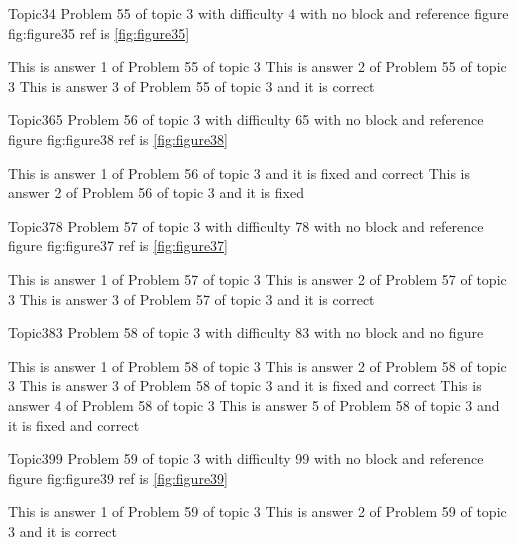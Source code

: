\documentclass[master]{exam}
\begin{document}
\begin{problem}{Topic3}{4}
	Problem 55 of topic 3 with difficulty 4 with no block and reference figure fig:figure35 ref is \ref{fig:figure35}
	\begin{answers}
		\answer This is answer 1 of Problem 55 of topic 3 
		\answer This is answer 2 of Problem 55 of topic 3 
		\answer[correct] This is answer 3 of Problem 55 of topic 3 and it is correct
	\end{answers}
\end{problem}

\begin{problem}{Topic3}{65}
	Problem 56 of topic 3 with difficulty 65 with no block and reference figure fig:figure38 ref is \ref{fig:figure38}
	\begin{answers}
		 This is answer 1 of Problem 56 of topic 3 and it is fixed and correct
		\answer[fixed] This is answer 2 of Problem 56 of topic 3 and it is fixed
	\end{answers}
\end{problem}

\begin{problem}{Topic3}{78}
	Problem 57 of topic 3 with difficulty 78 with no block and reference figure fig:figure37 ref is \ref{fig:figure37}
	\begin{answers}
		\answer This is answer 1 of Problem 57 of topic 3 
		\answer This is answer 2 of Problem 57 of topic 3 
		\answer[correct] This is answer 3 of Problem 57 of topic 3 and it is correct
	\end{answers}
\end{problem}

\begin{problem}{Topic3}{83}
	Problem 58 of topic 3 with difficulty 83 with no block and no figure
	\begin{answers}
		\answer This is answer 1 of Problem 58 of topic 3 
		\answer This is answer 2 of Problem 58 of topic 3 
		 This is answer 3 of Problem 58 of topic 3 and it is fixed and correct
		\answer This is answer 4 of Problem 58 of topic 3 
		 This is answer 5 of Problem 58 of topic 3 and it is fixed and correct
	\end{answers}
\end{problem}

\begin{problem}{Topic3}{99}
	Problem 59 of topic 3 with difficulty 99 with no block and reference figure fig:figure39 ref is \ref{fig:figure39}
	\begin{answers}
		\answer This is answer 1 of Problem 59 of topic 3 
		\answer[correct] This is answer 2 of Problem 59 of topic 3 and it is correct
	\end{answers}
\end{problem}
\end{document}
